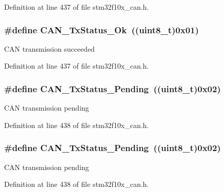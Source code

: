 Definition at line 437 of file stm32f10x\+\_\+can.\+h.

\subsubsection[{\texorpdfstring{C\+A\+N\+\_\+\+Tx\+Status\+\_\+\+Ok}{CAN_TxStatus_Ok}}]{\setlength{\rightskip}{0pt plus 5cm}\#define C\+A\+N\+\_\+\+Tx\+Status\+\_\+\+Ok~(({\bf uint8\+\_\+t})0x01)}\hypertarget{group___c_a_n__transmit__constants_ga0b401c61922b1449de9b486dcf475c97}{}\label{group___c_a_n__transmit__constants_ga0b401c61922b1449de9b486dcf475c97}
C\+AN transmission succeeded 

Definition at line 437 of file stm32f10x\+\_\+can.\+h.

\subsubsection[{\texorpdfstring{C\+A\+N\+\_\+\+Tx\+Status\+\_\+\+Pending}{CAN_TxStatus_Pending}}]{\setlength{\rightskip}{0pt plus 5cm}\#define C\+A\+N\+\_\+\+Tx\+Status\+\_\+\+Pending~(({\bf uint8\+\_\+t})0x02)}\hypertarget{group___c_a_n__transmit__constants_ga9678a3a51379422868083608c7394409}{}\label{group___c_a_n__transmit__constants_ga9678a3a51379422868083608c7394409}
C\+AN transmission pending 

Definition at line 438 of file stm32f10x\+\_\+can.\+h.

\subsubsection[{\texorpdfstring{C\+A\+N\+\_\+\+Tx\+Status\+\_\+\+Pending}{CAN_TxStatus_Pending}}]{\setlength{\rightskip}{0pt plus 5cm}\#define C\+A\+N\+\_\+\+Tx\+Status\+\_\+\+Pending~(({\bf uint8\+\_\+t})0x02)}\hypertarget{group___c_a_n__transmit__constants_ga9678a3a51379422868083608c7394409}{}\label{group___c_a_n__transmit__constants_ga9678a3a51379422868083608c7394409}
C\+AN transmission pending 

Definition at line 438 of file stm32f10x\+\_\+can.\+h.

